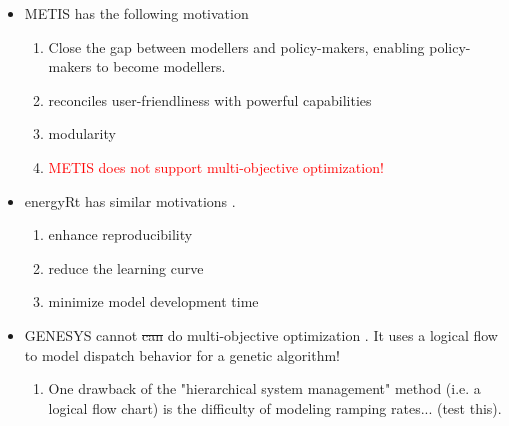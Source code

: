 \begin{itemize}
    \item METIS has the following motivation \cite{sakellaris_metis_2018}
    \begin{enumerate}
        \item Close the gap between modellers and policy-makers, enabling policy-makers to become modellers.
        \item reconciles user-friendliness with powerful capabilities
        \item modularity
        \item \textcolor{red}{METIS does not support multi-objective optimization!}    
    \end{enumerate}
    \item energyRt has similar motivations \cite{lugovoy_energyrt_2022}.
    \begin{enumerate}
        \item enhance reproducibility
        \item reduce the learning curve
        \item minimize model development time
    \end{enumerate}
    \item GENESYS cannot \sout{can} do multi-objective optimization \cite{bussar_optimal_2014}. It uses a logical flow to model dispatch behavior for a genetic algorithm!
    \begin{enumerate}
        \item One drawback of the "hierarchical system management" method (i.e. a logical flow chart) is the difficulty of modeling ramping rates... (test this).
    \end{enumerate}
\end{itemize}

